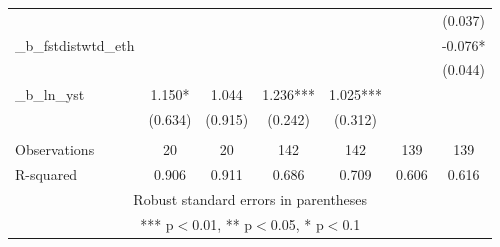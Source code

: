 \documentclass[]{article}
\begin{document}
\begin{tabular}{lcccccc}
 &  &  &  &  &  & (0.037) \\
\_b\_fstdistwtd\_eth &  &  &  &  &  & -0.076* \\
 &  &  &  &  &  & (0.044) \\
\_b\_ln\_yst & 1.150* & 1.044 & 1.236*** & 1.025*** &  &  \\
 & (0.634) & (0.915) & (0.242) & (0.312) &  &  \\
 &  &  &  &  &  &  \\
Observations & 20 & 20 & 142 & 142 & 139 & 139 \\
 R-squared & 0.906 & 0.911 & 0.686 & 0.709 & 0.606 & 0.616 \\ \hline
\multicolumn{7}{c}{ Robust standard errors in parentheses} \\
\multicolumn{7}{c}{ *** p$<$0.01, ** p$<$0.05, * p$<$0.1} \\
\end{tabular}
\end{document}
